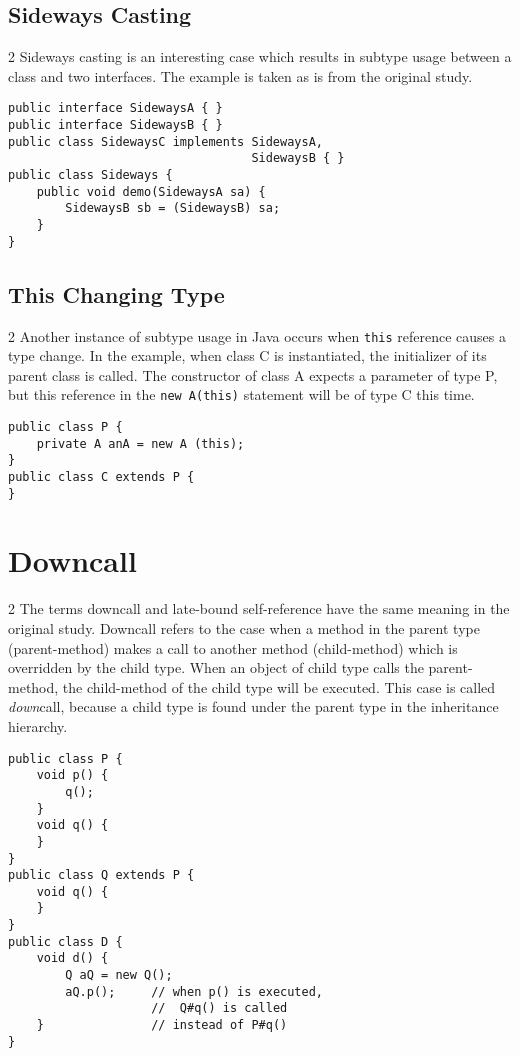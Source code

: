 \documentclass{uvamscse}
\begin{document}
\subsection{Sideways Casting}
\begin{multicols} {2}
Sideways casting is an interesting case which results in subtype usage between a class and two interfaces. The example is taken as is from the original study.
\columnbreak
\begin{verbatim}
public interface SidewaysA { }
public interface SidewaysB { }
public class SidewaysC implements SidewaysA, 
                                  SidewaysB { }
public class Sideways {
    public void demo(SidewaysA sa) {
        SidewaysB sb = (SidewaysB) sa;
    }
}
\end{verbatim}
\end{multicols}

\subsection{This Changing Type}
\begin{multicols} {2}
Another instance of subtype usage in Java occurs when \texttt{this} reference causes a type change. In the example, when class C is instantiated, the initializer of its parent class is called. The constructor of class A expects a parameter of type P, but this reference in the \texttt{new A(this)} statement will be of type C this time.

\columnbreak
\begin{verbatim}
public class P {
    private A anA = new A (this);
}
public class C extends P {
}
\end{verbatim}
\end{multicols}

\section{Downcall}
\begin{multicols} {2}
The terms downcall and late-bound self-reference have the same meaning in the original study. Downcall refers to the case when a method in the parent type (parent-method) makes a call to another method (child-method) which is overridden by the child type. When an object of child type calls the parent-method, the child-method of the child type will be executed. This case is called \textit{down}call, because a child type is found under the parent type in the inheritance hierarchy.
\columnbreak
\begin{verbatim}
public class P {
    void p() {
        q();
    }
    void q() {
    }
}
public class Q extends P {
    void q() {
    }
}
public class D {
    void d() {
        Q aQ = new Q();
        aQ.p();     // when p() is executed,
                    //  Q#q() is called
    }               // instead of P#q()
}
\end{verbatim}
\end{multicols}
\end{document}
